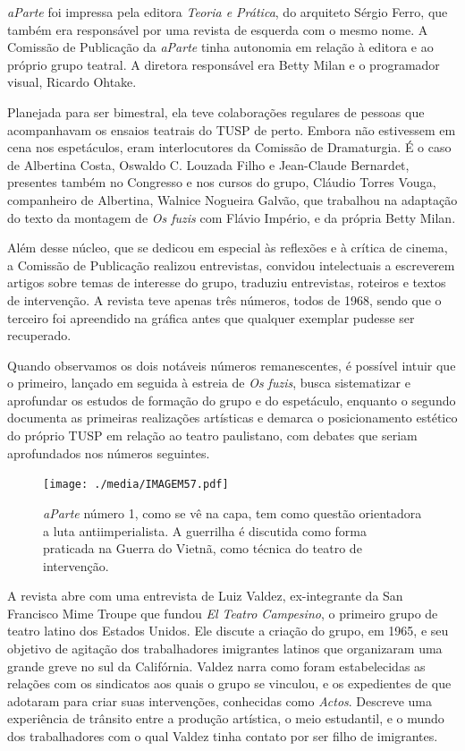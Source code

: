 \textit{aParte} foi impressa pela editora \textit{Teoria e Prática}, do
arquiteto Sérgio Ferro, que também era responsável por uma revista de
esquerda com o mesmo nome. A Comissão de Publicação da \textit{aParte}
tinha autonomia em relação à editora e ao próprio grupo teatral. A
diretora responsável era Betty Milan e o programador visual, Ricardo
Ohtake.

Planejada para ser bimestral, ela teve colaborações regulares de pessoas
que acompanhavam os ensaios teatrais do TUSP de perto. Embora não
estivessem em cena nos espetáculos, eram interlocutores da Comissão de
Dramaturgia. É o caso de Albertina Costa, Oswaldo C. Louzada Filho e
Jean-Claude Bernardet, presentes também no Congresso e nos cursos do
grupo, Cláudio Torres Vouga, companheiro de Albertina, Walnice Nogueira
Galvão, que trabalhou na adaptação do texto da montagem de \textit{Os
fuzis} com Flávio Império, e da própria Betty Milan.

Além desse núcleo, que se dedicou em especial às reflexões e à crítica
de cinema, a Comissão de Publicação realizou entrevistas, convidou
intelectuais a escreverem artigos sobre temas de interesse do grupo,
traduziu entrevistas, roteiros e textos de intervenção. A revista teve
apenas três números, todos de 1968, sendo que o terceiro foi apreendido
na gráfica antes que qualquer exemplar pudesse ser recuperado.

Quando observamos os dois notáveis números remanescentes, é possível
intuir que o primeiro, lançado em seguida à estreia de \textit{Os fuzis},
busca sistematizar e aprofundar os estudos de formação do grupo e do
espetáculo, enquanto o segundo documenta as primeiras realizações
artísticas e demarca o posicionamento estético do próprio TUSP em
relação ao teatro paulistano, com debates que seriam aprofundados nos
números seguintes.

\begin{figure}
\texttt{[image: ./media/IMAGEM57.pdf]}
\caption{\textit{aParte} número 1, como se vê na capa, tem como questão orientadora
a luta antiimperialista. A guerrilha é discutida como forma praticada na
Guerra do Vietnã, como técnica do teatro de intervenção.}
\end{figure}

A revista abre com uma entrevista de Luiz Valdez, ex-integrante da San
Francisco Mime Troupe que fundou \textit{El Teatro Campesino}, o primeiro
grupo de teatro latino dos Estados Unidos. Ele discute a criação do
grupo, em 1965, e seu objetivo de agitação dos trabalhadores imigrantes
latinos que organizaram uma grande greve no sul da Califórnia. Valdez
narra como foram estabelecidas as relações com os sindicatos aos quais o
grupo se vinculou, e os expedientes de que adotaram para criar suas
intervenções, conhecidas como \textit{Actos}. Descreve uma experiência de
trânsito entre a produção artística, o meio estudantil, e o mundo dos
trabalhadores com o qual Valdez tinha contato por ser filho de
imigrantes.

